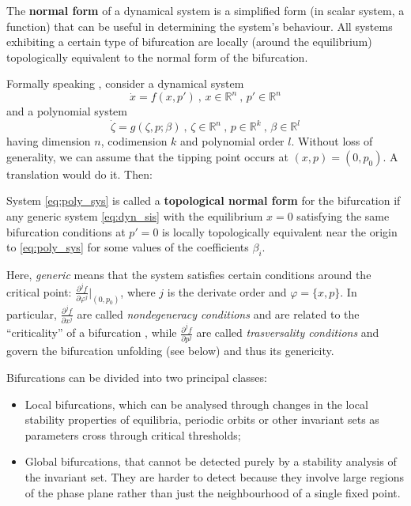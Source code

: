 \begin{definition}
	The \textbf{normal form} of a dynamical system is a simplified form (in scalar system, a function) that can be useful in determining the system's behaviour. All systems exhibiting a certain type of bifurcation are locally (around the equilibrium) topologically equivalent to the normal form of the bifurcation.
\end{definition}
Formally speaking \citep{kuznetsov2013elements}, consider a dynamical system
\begin{equation}
	\dot{x} = f(x,p') \ , \, x\in \mathbb{R}^n \ , \, p' \in \mathbb{R}^n
	\label{eq:dyn_sis}
\end{equation}
and a polynomial system
\begin{equation}
	\dot{\zeta} = g(\zeta,p;\beta) \ , \, \zeta \in \mathbb{R}^n \ , \, p \in \mathbb{R}^k \ , \, \beta \in \mathbb{R}^l
	\label{eq:poly_sys}
\end{equation}
having dimension $n$, codimension $k$ and polynomial order $l$. Without loss of generality, we can assume that the tipping point occurs at $(x,p)=(0,p_0)$. A translation would do it. Then:
\begin{definition}
	System \ref{eq:poly_sys} is called a \textbf{topological normal form} for the bifurcation if any generic system \ref{eq:dyn_sis} with the equilibrium $x=0$ satisfying the same bifurcation conditions at $p' = 0$ is locally topologically equivalent near the origin to \ref{eq:poly_sys} for some values of the coefficients $\beta_i$.
	\label{def:normal_form}
\end{definition}
Here, \textit{generic} means that the system satisfies certain conditions around the critical point: $\frac{\partial^j f}{\partial \varphi^j}|_{(0,p_0)}$, where $j$ is the derivate order and $\varphi = \{x, p\}$. In particular, $\frac{\partial^j f}{\partial x^j}$ are called \textit{nondegeneracy conditions} and are related to the ``criticality'' of a bifurcation \citep{kuehn2011mathematical}, while $\frac{\partial^j f}{\partial p^j}$ are called \textit{trasversality conditions} and govern the bifurcation unfolding (see below) and thus its genericity.

Bifurcations can be divided into two principal classes:
\begin{itemize}
	\item Local bifurcations, which can be analysed through changes in the local stability properties of equilibria, periodic orbits or other invariant sets as parameters cross through critical thresholds;
	\item Global bifurcations, that cannot be detected purely by a stability analysis of the invariant set. They are harder to detect because they involve large regions of the phase plane rather than just the neighbourhood of a single fixed point.
\end{itemize}

